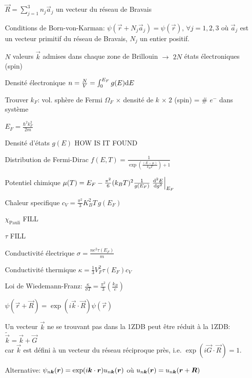 \begin{squishlist}
    \item $\vec{R} = \sum_{j=1}^{3} n_j \vec{a}_j$ un vecteur du réseau de Bravais
    \item Conditions de Born-von-Karman: $\psi(\vec{r} + N_j \vec{a}_j) = \psi(\vec{r}), \, \forall j=1,2,3$ où $\vec{a}_j$ est un vecteur primitif du réseau de Bravais, $N_j$ un entier positif.
    \item $N$ valeurs $\vec{k}$ admises dans chaque zone de Brillouin $\rightarrow$ $2N$ états électroniques (spin)
    \item Densité électronique $n = \frac{N}{V} = \int_0^{E_F} g(E) \ud E$
\end{squishlist}

\begin{squishlist}
    \item Trouver $k_F$: vol. sphère de Fermi $\Omega_F$ $\times$ densité de $k$ $\times \; 2$ (spin) = \# $e^-$ dans système 
    \item $E_F = \frac{\hbar^2 k_F^2}{2m}$
\end{squishlist}

\begin{squishlist}
    \item Densité d'états $g(E)$ HOW IS IT FOUND
    \item Distribution de Fermi-Dirac $f(E,T) = \frac{1}{\exp\left(\frac{(E- \mu)}{k_B T}\right) + 1}$
    \item Potentiel chimique $\mu(T) = E_F - \frac{\pi^2}{6}(k_B T)^2 \frac{1}{g(E_F)} \left.\dder{g}{E}\right|_{E_F}$
    \item Chaleur specifique $c_V = \frac{\pi^2}{3}K_B^2 T \, g(E_F) $
    \item $\chi_{\text{Pauli}}$ FILL
    \item $\tau$ FILL
    \item Conductivité électrique $\sigma = \frac{n e^2 \tau(E_F)}{m}$
    \item Conductivité thermique $\kappa = \frac{1}{3}V_F^2 \tau(E_F) c_V$
    \item Loi de Wiedemann-Franz: $\frac{\kappa}{\sigma T} = \frac{\pi^2}{3}\left(\frac{k_B}{e}\right)$
\end{squishlist}

\begin{squishlist}
    \item $\psi(\vec{r} + \vec{R}) = \exp(i\vec{k} \cdot \vec{R}) \psi(\vec{r})$
    \item Un vecteur $\vec{k}$ ne se trouvant pas dans la 1ZDB peut être réduit à la 1ZDB: $\tilde{\vec{k}} = \vec{k} + \vec{G}$ \\
    car $\vec{k}$ est défini à un vecteur du réseau réciproque près, i.e. $\exp(i \vec{G}\cdot \vec{R}) = 1$.
    \item Alternative: $\psi_{n \vec{k}}(\vr) = \exp(i \vk \cdot \vr ) u_{n \vk}(\vr)$ où $u_{n \vk}(\vr) =  u_{n \vk}(\vr+ \vR)$
\end{squishlist}

